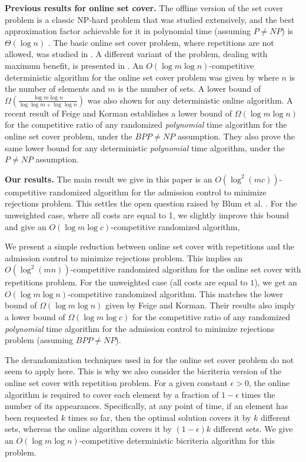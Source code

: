 \documentclass{sig-alternate}
\begin{document}
\textbf{Previous results for online set cover.} The offline
version of the set cover problem is a classic NP-hard problem that
was studied extensively, and the best approximation factor
achievable for it in polynomial time (assuming $P \neq NP$) is
$\Theta(\log n)$ \cite{C79,F98}. The basic online set cover
problem, where repetitions are not allowed, was studied in
\cite{AAABN03,FK05}. A different variant of the problem, dealing
with maximum benefit, is presented in \cite{AAFL96}. An $O(\log m
\log n)$-competitive deterministic algorithm for the online set
cover problem was given by \cite{AAABN03} where $n$ is the number
of elements and $m$ is the number of sets. A lower bound of
$\Omega(\frac{\log m \log n}{\log \log m + \log \log n})$ was also
shown for any deterministic online algorithm. A recent result of
Feige and Korman \cite{FK05} establishes a lower bound of
$\Omega(\log m \log n)$ for the competitive ratio of any
randomized {\em polynomial} time algorithm for the online set
cover problem, under the $BPP \neq NP$ assumption. They also prove
the same lower bound for any deterministic {\em polynomial} time
algorithm, under the $P \neq NP$ assumption.

\textbf{Our results.} The main result we give in this paper is an
$O(\log^2 (mc))$-competitive randomized algorithm for the
admission control to minimize rejections problem. This settles the
open question raised by Blum et al. \cite{BlKaKl01}. For the
unweighted case, where all costs are equal to 1, we slightly
improve this bound and give an $O(\log m \log c)$-competitive
randomized algorithm,

We present a simple reduction between online set cover with
repetitions and the admission control to minimize rejections
problem. This implies an $O(\log^2 (mn))$-competitive randomized
algorithm for the online set cover with repetitions problem. For
the unweighted case (all costs are equal to $1$), we get an
$O(\log m \log n)$-competitive randomized algorithm. This matches
the lower bound of $\Omega(\log m \log n)$ given by Feige and
Korman. Their results also imply a lower bound of $\Omega(\log m
\log c)$ for the competitive ratio of any randomized {\em
polynomial} time algorithm for the admission control to minimize
rejections problem (assuming $BPP \neq NP$).

The derandomization techniques used in \cite{AAABN03} for the
online set cover problem do not seem to apply here. This is why we
also consider the bicriteria version of the online set cover with
repetition problem. For a given constant $\epsilon > 0$, the
online algorithm is required to cover each element by a fraction
of $1-\epsilon$ times the number of its appearances. Specifically,
at any point of time, if an element has been requested $k$ times
so far, then the optimal solution covers it by $k$ different sets,
whereas the online algorithm covers it by $(1-\epsilon)k$
different sets. We give an $O(\log m \log n)$-competitive
deterministic bicriteria algorithm for this problem.
\end{document}
